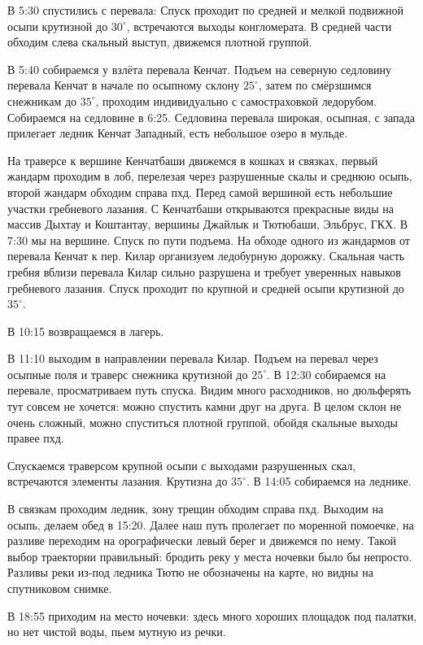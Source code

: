 В 5:30 спустились с перевала: Спуск проходит по средней и мелкой подвижной осыпи крутизной до
$30^\circ$, встречаются выходы конгломерата. В средней части обходим слева скальный выступ, движемся плотной группой.

В 5:40 собираемся у взлёта перевала Кенчат. Подъем на северную седловину перевала Кенчат в начале
по осыпному склону $25^\circ$, затем по смёрзшимся снежникам до $35^\circ$, проходим индивидуально с самостраховкой ледорубом. Собираемся на седловине в 6:25. Седловина перевала широкая, осыпная, с запада прилегает ледник Кенчат Западный, есть небольшое озеро в мульде.

На траверсе к вершине Кенчатбаши движемся в кошках и связках, первый жандарм проходим в
лоб, перелезая через разрушенные скалы и среднюю осыпь, второй жандарм обходим справа
пхд. Перед самой вершиной есть небольшие участки гребневого
лазания. С Кенчатбаши открываются прекрасные виды на массив Дыхтау и Коштантау, вершины
Джайлык и Тютюбаши, Эльбрус, ГКХ. В 7:30 мы на вершине. Спуск по пути подъема. На обходе одного из жандармов от перевала Кенчат к пер. Килар организуем ледобурную дорожку. Скальная
часть гребня вблизи перевала Килар сильно разрушена и требует уверенных навыков гребневого лазания. Спуск проходит по крупной и средней осыпи крутизной до $35^\circ$.

В 10:15 возвращаемся в лагерь.

В 11:10 выходим в направлении перевала Килар. Подъем на перевал через осыпные поля и траверс снежника крутизной до $25^\circ$. В 12:30 собираемся на перевале, просматриваем путь спуска. Видим много расходников, но дюльферять тут совсем не хочется: можно спустить камни друг на друга. В целом склон не очень сложный, можно спуститься плотной группой, обойдя скальные выходы правее пхд.

Спускаемся траверсом крупной осыпи с выходами разрушенных скал, встречаются элементы лазания. Крутизна до $35^\circ$. В 14:05 собираемся на леднике.

В связкам проходим ледник, зону трещин обходим справа пхд. Выходим на осыпь, делаем обед в 15:20.
Далее наш путь пролегает по моренной помоечке, на разливе переходим на орографически левый берег и движемся по нему. Такой выбор траектории правильный: бродить реку у места ночевки было бы непросто. Разливы реки из-под ледника Тютю не обозначены на карте, но видны на спутниковом снимке.

В 18:55 приходим на место ночевки: здесь много хороших площадок под палатки, но нет чистой воды, пьем мутную из речки.

